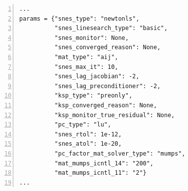 \documentclass[format=acmsmall,screen,timestamp=false,a4paper]{acmart}
\newcommand\josh[1]{\textbf{\textcolor[rgb]{0,.5,1}{[Josh: #1]}}}
\newcommand\lm[1]{\textbf{\textcolor[rgb]{1,0,0.5}{[Lawrence: #1]}}}
\begin{document}
\begin{lstlisting}[float=htbp,caption={An example of some solver parameters that we can use for the mixed Poisson problem.  The options presented here solve the algebraic system with a simplified Newton method where the Jacobian is held constant at the first iterate.  Therefore it is factored at the beginning and triangular solves are applied to it at each subsequent iteration.  This has the effect of performing iterative refinement \cite{wilkinson1994rounding,moler1967iterative} and yields an increased algebraic accuracy on fine meshes.}, label={lst:solver_parameters}, numbers=left, firstnumber=1, xleftmargin=20pt,  xrightmargin=20pt]
...
params = {"snes_type": "newtonls",
          "snes_linesearch_type": "basic",
          "snes_monitor": None,
          "snes_converged_reason": None,
          "mat_type": "aij",
          "snes_max_it": 10,
          "snes_lag_jacobian": -2,
          "snes_lag_preconditioner": -2,
          "ksp_type": "preonly",
          "ksp_converged_reason": None,
          "ksp_monitor_true_residual": None,
          "pc_type": "lu",
          "snes_rtol": 1e-12,
          "snes_atol": 1e-20,
          "pc_factor_mat_solver_type": "mumps",
          "mat_mumps_icntl_14": "200",
          "mat_mumps_icntl_11": "2"}
...
\end{lstlisting}




\end{document}
